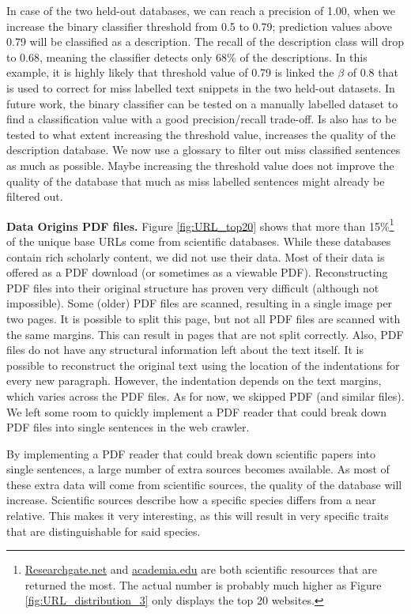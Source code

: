\documentclass[a4paper, 12pt, oneside]{book} %
\begin{document}
In case of the two held-out databases, we can reach a precision of 1.00, when we increase the binary classifier threshold from 0.5 to 0.79; prediction values above 0.79 will be classified as a description.
The recall of the description class will drop to 0.68, meaning the classifier detects only 68\% of the descriptions.
In this example, it is highly likely that threshold value of 0.79 is linked the $\beta$ of 0.8 that is used to correct for miss labelled text snippets in the two held-out datasets. 
In future work, the binary classifier can be tested on a manually labelled dataset to find a classification value with a good precision/recall trade-off.  
Is also has to be tested to what extent increasing the threshold value, increases the quality of the description database. 
We now use a glossary to filter out miss classified sentences as much as possible.
Maybe increasing the threshold value does not improve the quality of the database that much as miss labelled sentences might already be filtered out.

\noindent
\newline
\textbf{Data Origins PDF files.}
Figure \ref{fig:URL_top20} shows that more than 15\%\footnote{\href{https://www.researchgate.net/}{Researchgate.net} and \href{https://www.academia.edu/}{academia.edu} are both scientific resources that are returned the most. The actual number is probably much higher as Figure \ref{fig:URL_distribution_3} only displays the top 20 websites.} of the unique base URLs come from scientific databases.
While these databases contain rich scholarly content, we did not use their data.
Most of their data is offered as a PDF download (or sometimes as a viewable PDF).
Reconstructing PDF files into their original structure has proven very difficult (although not impossible).
Some (older) PDF files are scanned, resulting in a single image per two pages. 
It is possible to split this page, but not all PDF files are scanned with the same margins. 
This can result in pages that are not split correctly.
Also, PDF files do not have any structural information left about the text itself. 
It is possible to reconstruct the original text using the location of the indentations for every new paragraph.
However, the indentation depends on the text margins, which varies across the PDF files.
As for now, we skipped PDF (and similar files). 
We left some room to quickly implement a PDF reader that could break down PDF files into single sentences in the web crawler.

By implementing a PDF reader that could break down scientific papers into single sentences, a large number of extra sources becomes available.
As most of these extra data will come from scientific sources, the quality of the database will increase.
Scientific sources describe how a specific species differs from a near relative.
This makes it very interesting, as this will result in very specific traits that are distinguishable for said species.
\end{document}

